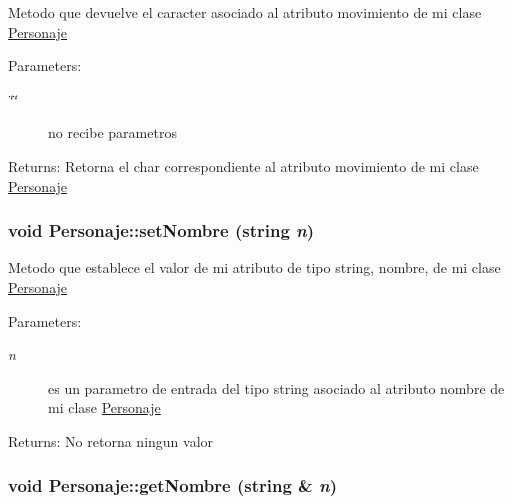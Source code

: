 Metodo que devuelve el caracter asociado al atributo movimiento de mi clase \hyperlink{classPersonaje}{Personaje} \begin{Desc}
\item[Parameters:]
\begin{description}
\item[{\em \char`\"{}\char`\"{}}]no recibe parametros \end{description}
\end{Desc}
\begin{Desc}
\item[Returns:]Retorna el char correspondiente al atributo movimiento de mi clase \hyperlink{classPersonaje}{Personaje} \end{Desc}
\hypertarget{classPersonaje_2e84ee485f46b434f1d23558ad3eb7c9}{
\subsubsection[setNombre]{\setlength{\rightskip}{0pt plus 5cm}void Personaje::setNombre (string {\em n})}}
\label{classPersonaje_2e84ee485f46b434f1d23558ad3eb7c9}


Metodo que establece el valor de mi atributo de tipo string, nombre, de mi clase \hyperlink{classPersonaje}{Personaje} \begin{Desc}
\item[Parameters:]
\begin{description}
\item[{\em n}]es un parametro de entrada del tipo string asociado al atributo nombre de mi clase \hyperlink{classPersonaje}{Personaje} \end{description}
\end{Desc}
\begin{Desc}
\item[Returns:]No retorna ningun valor \end{Desc}
\hypertarget{classPersonaje_801e7fe38d0727d3219e51e916e2ce67}{
\subsubsection[getNombre]{\setlength{\rightskip}{0pt plus 5cm}void Personaje::getNombre (string \& {\em n})}}
\label{classPersonaje_801e7fe38d0727d3219e51e916e2ce67}


